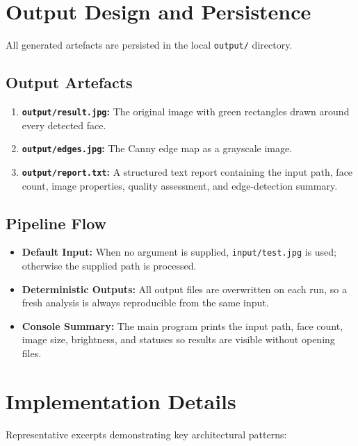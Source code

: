 \documentclass[11pt,a4paper]{article}
\begin{document}
\section{Output Design and Persistence}
All generated artefacts are persisted in the local \texttt{output/} directory.

\subsection{Output Artefacts}
\begin{enumerate}[leftmargin=1.5em]
    \item \textbf{\texttt{output/result.jpg}:} The original image with green rectangles drawn around every detected face.
    \item \textbf{\texttt{output/edges.jpg}:} The Canny edge map as a grayscale image.
    \item \textbf{\texttt{output/report.txt}:} A structured text report containing the input path, face count, image properties, quality assessment, and edge-detection summary.
\end{enumerate}

\subsection{Pipeline Flow}
\begin{itemize}[leftmargin=1.5em]
    \item \textbf{Default Input:} When no argument is supplied, \texttt{input/test.jpg} is used; otherwise the supplied path is processed.
    \item \textbf{Deterministic Outputs:} All output files are overwritten on each run, so a fresh analysis is always reproducible from the same input.
    \item \textbf{Console Summary:} The main program prints the input path, face count, image size, brightness, and statuses so results are visible without opening files.
\end{itemize}

\section{Implementation Details}
Representative excerpts demonstrating key architectural patterns:
\end{document}
